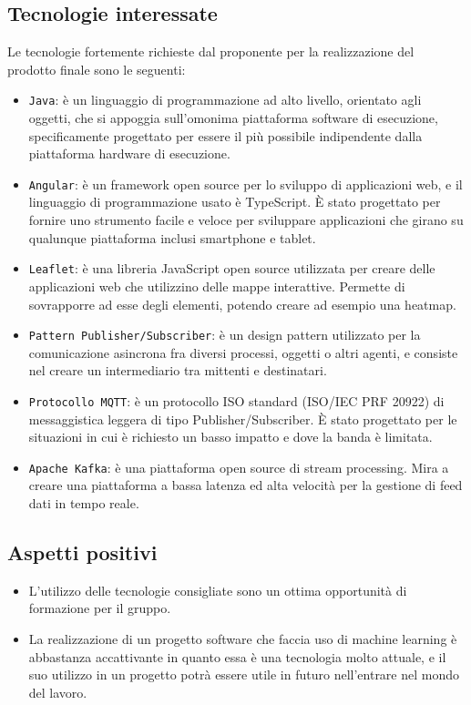 \subsection{Tecnologie interessate}
Le tecnologie fortemente richieste dal proponente per la realizzazione del prodotto finale sono le seguenti:
\begin{itemize}
    \item \verb|Java|: è un linguaggio di programmazione ad alto livello, orientato agli oggetti, che si appoggia sull'omonima piattaforma software di esecuzione, specificamente progettato per essere il più possibile indipendente dalla piattaforma hardware di esecuzione.
    \item \verb|Angular|: è un framework open source per lo sviluppo di applicazioni web, e il linguaggio di programmazione usato è TypeScript. È stato progettato per fornire uno strumento facile e veloce per sviluppare applicazioni che girano su qualunque piattaforma inclusi smartphone e tablet.
    \item \verb|Leaflet|: è una libreria JavaScript open source utilizzata per creare delle applicazioni web che utilizzino delle mappe interattive. Permette di sovrapporre ad esse degli elementi, potendo creare ad esempio una heatmap.
    \item \verb|Pattern Publisher/Subscriber|: è un design pattern utilizzato per la comunicazione asincrona fra diversi processi, oggetti o altri agenti, e consiste nel creare un intermediario tra mittenti e destinatari.
    \item \verb|Protocollo MQTT|: è un protocollo ISO standard (ISO/IEC PRF 20922) di messaggistica leggera di tipo Publisher/Subscriber. È stato progettato per le situazioni in cui è richiesto un basso impatto e dove la banda è limitata.
    \item \verb|Apache Kafka|: è una piattaforma open source di stream processing. Mira a creare una piattaforma a bassa latenza ed alta velocità per la gestione di feed dati in tempo reale.
\end{itemize}

\subsection{Aspetti positivi}
\begin{itemize}
    \item L’utilizzo delle tecnologie consigliate sono un ottima opportunità di formazione per il gruppo.
    \item La realizzazione di un progetto software che faccia uso di machine learning è abbastanza accattivante in quanto essa è una tecnologia molto attuale, e il suo utilizzo in un progetto potrà essere utile in futuro nell’entrare nel mondo del lavoro.
\end{itemize}

